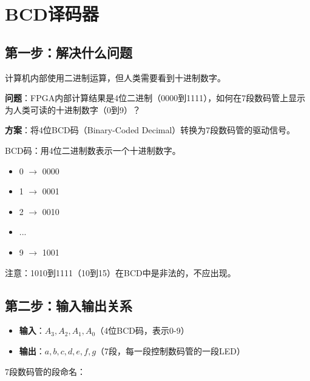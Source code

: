 \chapter{BCD译码器}

\section{第一步：解决什么问题}

计算机内部使用二进制运算，但人类需要看到十进制数字。

\textbf{问题}：FPGA内部计算结果是4位二进制（0000到1111），如何在7段数码管上显示为人类可读的十进制数字（0到9）？

\textbf{方案}：将4位BCD码（Binary-Coded Decimal）转换为7段数码管的驱动信号。

BCD码：用4位二进制数表示一个十进制数字。

\begin{itemize}
  \item 0 $\to$ 0000
  \item 1 $\to$ 0001
  \item 2 $\to$ 0010
  \item ...
  \item 9 $\to$ 1001
\end{itemize}

注意：1010到1111（10到15）在BCD中是非法的，不应出现。

\section{第二步：输入输出关系}

\begin{itemize}
  \item \textbf{输入}：$A_3, A_2, A_1, A_0$（4位BCD码，表示0-9）
  \item \textbf{输出}：$a, b, c, d, e, f, g$（7段，每一段控制数码管的一段LED）
\end{itemize}

7段数码管的段命名：

\begin{center}
\end{center}

